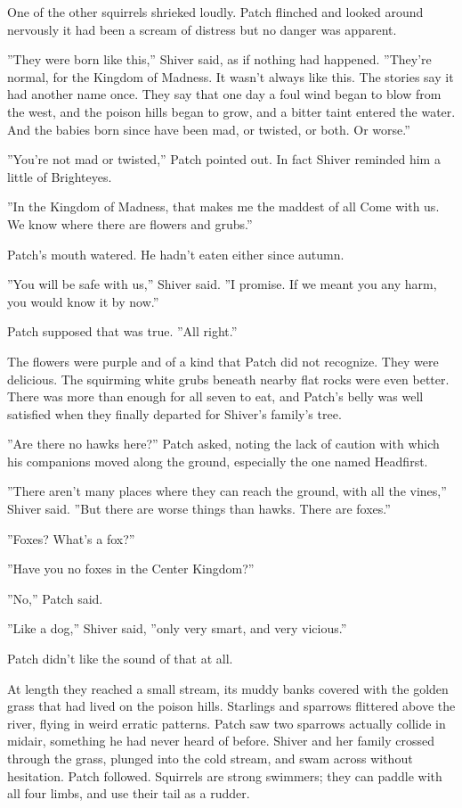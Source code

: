 \documentclass[12pt]{book}
\begin{document}
One of the other squirrels shrieked loudly. Patch flinched and looked around nervously %
it had been a scream of distress %
but no danger was apparent.

''They were born like this,'' Shiver said, as if nothing had happened. ''They're normal, for the Kingdom of Madness. It wasn't always like this. The stories say it had another name once. They say that one day a foul wind began to blow from the west, and the poison hills began to grow, and a bitter taint entered the water. And the babies born since have been mad, or twisted, or both. Or worse.''

''You're not mad or twisted,'' Patch pointed out. In fact Shiver reminded him a little of Brighteyes.

''In the Kingdom of Madness, that makes me the maddest of all %
Come with us. We know where there are flowers and grubs.''

Patch's mouth watered. He hadn't eaten either since autumn.

''You will be safe with us,'' Shiver said. ''I promise. If we meant you any harm, you would know it by now.''

Patch supposed that was true. ''All right.''

The flowers were purple and of a kind that Patch did not recognize. They were delicious. The squirming white grubs beneath nearby flat rocks were even better. There was more than enough for all seven to eat, and Patch's belly was well satisfied when they finally departed for Shiver's family's tree.

''Are there no hawks here?'' Patch asked, noting the lack of caution with which his companions moved along the ground, especially the one named Headfirst. 

''There aren't many places where they can reach the ground, with all the vines,'' Shiver said. ''But there are worse things than hawks. There are foxes.''

''Foxes? What's a fox?''

''Have you no foxes in the Center Kingdom?''

''No,'' Patch said.

''Like a dog,'' Shiver said, ''only very smart, and very vicious.''

Patch didn't like the sound of that at all.

At length they reached a small stream, its muddy banks covered with the golden grass that had lived on the poison hills. Starlings and sparrows flittered above the river, flying in weird erratic patterns. Patch saw two sparrows actually collide in midair, something he had never heard of before. Shiver and her family crossed through the grass, plunged into the cold stream, and swam across without hesitation. Patch followed. Squirrels are strong swimmers; they can paddle with all four limbs, and use their tail as a rudder.
\end{document}
